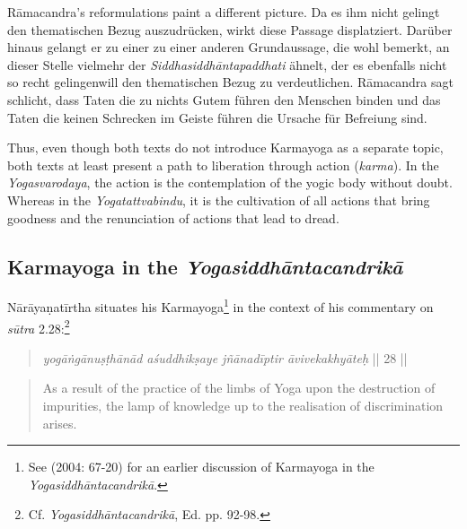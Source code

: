   Rāmacandra's reformulations paint a different picture. Da es ihm nicht gelingt den thematischen Bezug auszudrücken, wirkt diese Passage displatziert. Darüber hinaus gelangt er zu einer zu einer anderen Grundaussage, die wohl bemerkt, an dieser Stelle vielmehr der \emph{Siddhasiddhāntapaddhati} ähnelt, der es ebenfalls nicht so recht gelingenwill den thematischen Bezug zu verdeutlichen. Rāmacandra sagt schlicht, dass Taten die zu nichts Gutem führen den Menschen binden und das Taten die keinen Schrecken im Geiste führen die Ursache für Befreiung sind.
  
Thus, even though both texts do not introduce Karmayoga as a separate topic, both texts at least present a path to liberation through action (\textit{karma}). In the \textit{Yogasvarodaya}, the action is the contemplation of the yogic body without doubt. Whereas in the \textit{Yogatattvabindu}, it is the cultivation of all actions that bring goodness and the renunciation of actions that lead to dread. 

\subsection{Karmayoga in the \textit{Yogasiddhāntacandrikā}}

Nārāyaṇatīrtha situates his Karmayoga\footnote{See \citeauthor{penna2004} (2004: 67-20) for an earlier discussion of Karmayoga in the \textit{Yogasiddhāntacandrikā}.} in the context of his commentary on \textit{sūtra} 2.28:\footnote{Cf. \textit{Yogasiddhāntacandrikā}, Ed. pp. 92-98.}

\begin{quote}
  \textit{yogāṅgānuṣṭhānād aśuddhikṣaye jñānadīptir āvivekakhyāteḥ} || 28 ||
\end{quote}
\begin{quote}
As a result of the practice of the limbs of Yoga upon the destruction of impurities, the lamp of knowledge up to the realisation of discrimination arises.
\end{quote}

